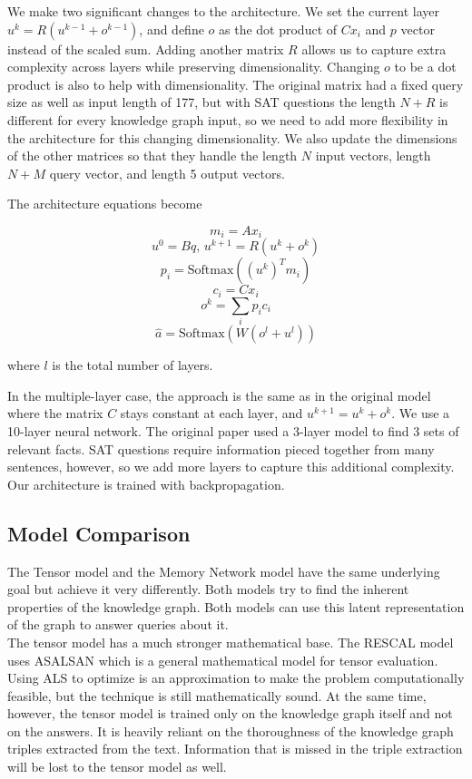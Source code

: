 \documentclass[pageno]{final_paper}
\begin{document}
 We make two significant changes to the architecture. We set the current layer
 $u^k = R(u^{k-1} + o^{k-1})$, and define $o$ as the dot product of $Cx_i$ and
 $p$ vector instead of the scaled sum. Adding another matrix $R$ allows us to
 capture extra complexity across layers while preserving dimensionality.
 Changing $o$ to be a dot product is also to help with dimensionality. The
 original matrix had a fixed query size as well as input length of 177, but with
 SAT questions the length $N+R$ is different for every knowledge graph input, so
 we need to add more flexibility in the architecture for this changing
 dimensionality. We also update the dimensions of the other matrices so that
 they handle the length $N$ input vectors, length $N+M$ query vector, and length
 5 output vectors.

The architecture equations become

$$m_i = Ax_i$$
$$u^0 = Bq,\, u^{k+1} = R(u^k + o^k)$$
$$p_i = \text{Softmax}\left(\left(u^k\right)^Tm_i\right)$$
$$c_i = Cx_i$$
$$o^k = \sum_i p_ic_i$$
$$\hat{a} = \text{Softmax}\left(W\left(o^l+u^l\right)\right)$$

where $l$ is the total number of layers.

In the multiple-layer case, the approach is the same as in the original model
where the matrix $C$ stays constant at each layer, and $u^{k+1} = u^k + o^k$. We
use a 10-layer neural network. The original paper used a 3-layer model to find 3
sets of relevant facts. SAT questions require information pieced together from
many sentences, however, so we add more layers to capture this additional
complexity. Our architecture is trained with backpropagation.

\subsection{Model Comparison}
\label{Model Comparison}

The Tensor model and the Memory Network model have the same underlying goal but
achieve it very differently. Both models try to find the inherent properties of
the knowledge graph. Both models can use this latent representation of the graph
to answer queries about it. \\

The tensor model has a much stronger mathematical base. The RESCAL model uses
ASALSAN \cite{Bader2007} which is a general mathematical model for tensor
evaluation. Using ALS to optimize is an approximation to make the problem
computationally feasible, but the technique is still mathematically sound. At
the same time, however, the tensor model is trained only on the knowledge graph
itself and not on the answers. It is heavily reliant on the thoroughness of the
knowledge graph triples extracted from the text. Information that is missed in
the triple extraction will be lost to the tensor model as well.
\end{document}

